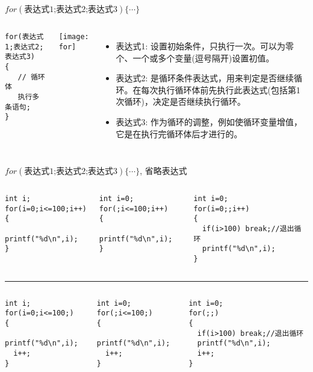 \begin{frame}{$for(\text{表达式1;表达式2;表达式3}) \{\cdots\}$}
\begin{columns}
\begin{lstlisting}[frame=single] 
for(表达式1;表达式2;表达式3)
{
   // 循环体
   执行多条语句;  
}
\end{lstlisting}
\texttt{[image: for]}
\begin{itemize}
\item 表达式1: 设置初始条件，只执行一次。可以为零个、一个或多个变量(逗号隔开)设置初值。
\item 表达式2: 是循环条件表达式，用来判定是否继续循环。在每次执行循环体前先执行此表达式(包括第1次循环)，决定是否继续执行循环。
\item 表达式3: 作为循环的调整，例如使循环变量增值，它是在执行完循环体后才进行的。	
\end{itemize}
\end{columns}
\end{frame}

\begin{frame}{$for(\text{表达式1;表达式2;表达式3}) \{\cdots\}$, 省略表达式}
\vspace{-0.5cm}
\begin{columns}%
\begin{lstlisting} 
int i;
for(i=0;i<=100;i++)
{
  printf("%d\n",i);
}
\end{lstlisting}
\begin{lstlisting}[frame=leftline] 
int i=0;
for(;i<=100;i++)
{
  printf("%d\n",i);
}
\end{lstlisting}
\begin{lstlisting}[frame=leftline]
int i=0;
for(i=0;;i++)
{
  if(i>100) break;//退出循环
  printf("%d\n",i);
}
\end{lstlisting}
\end{columns}
\rule{\textwidth}{1pt} %
\begin{columns}%
\begin{lstlisting} 
int i;
for(i=0;i<=100;)
{
  printf("%d\n",i);
  i++;
}
\end{lstlisting}
\begin{lstlisting}[frame=leftline] 
int i=0;
for(;i<=100;)
{
  printf("%d\n",i);
  i++;
}
\end{lstlisting}
\begin{lstlisting}[frame=leftline] 
int i=0;
for(;;)
{
  if(i>100) break;//退出循环  
  printf("%d\n",i);
  i++;
}
\end{lstlisting}
\end{columns}
\end{frame}

